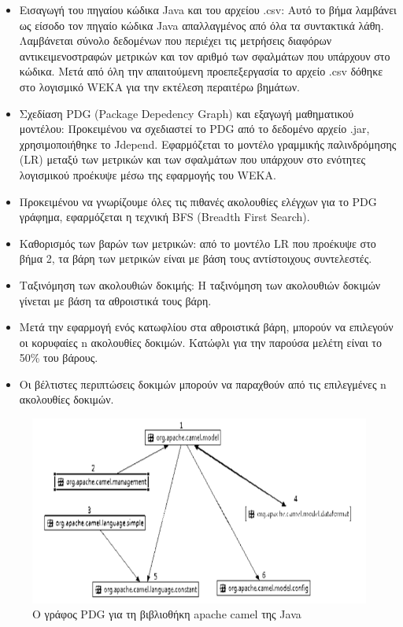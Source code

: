 \documentclass[12pt]{article}
\begin{document}
\begin{itemize}
\item Εισαγωγή του πηγαίου κώδικα Java και του αρχείου .csv: Αυτό το βήμα λαμβάνει ως είσοδο τον πηγαίο κώδικα Java απαλλαγμένος από όλα τα συντακτικά λάθη. Λαμβάνεται σύνολο δεδομένων που περιέχει τις μετρήσεις διαφόρων αντικειμενοστραφών μετρικών και τον αριθμό των σφαλμάτων που υπάρχουν στο κώδικα. Μετά από όλη την απαιτούμενη προεπεξεργασία το αρχείο .csv δόθηκε στο λογισμικό WEKA για την εκτέλεση περαιτέρω βημάτων.

\item Σχεδίαση PDG (Package Depedency Graph) και εξαγωγή μαθηματικού μοντέλου: Προκειμένου να σχεδιαστεί το PDG από το δεδομένο αρχείο .jar, χρησιμοποιήθηκε το Jdepend. Εφαρμόζεται το μοντέλο γραμμικής παλινδρόμησης (LR) μεταξύ των μετρικών και των σφαλμάτων που υπάρχουν στο ενότητες λογισμικού προέκυψε μέσω της εφαρμογής του WEKA.

\item Προκειμένου να γνωρίζουμε όλες τις πιθανές ακολουθίες ελέγχων για το PDG γράφημα, εφαρμόζεται η τεχνική BFS (Breadth First Search).

\item Καθορισμός των βαρών των μετρικών: από το μοντέλο LR που προέκυψε στο βήμα 2, τα βάρη των μετρικών είναι με βάση τους αντίστοιχους συντελεστές.

\item Ταξινόμηση των ακολουθιών δοκιμής: Η ταξινόμηση των ακολουθιών δοκιμών γίνεται με βάση τα αθροιστικά τους βάρη. 

\item Μετά την εφαρμογή ενός κατωφλίου στα αθροιστικά βάρη, μπορούν να επιλεγούν οι κορυφαίες n ακολουθίες δοκιμών. Κατώφλι για την παρούσα μελέτη είναι το 50\% του βάρους.

\item Οι βέλτιστες περιπτώσεις δοκιμών μπορούν να παραχθούν από τις επιλεγμένες n ακολουθίες δοκιμών.

\end{itemize}
 
\begin{figure}
\label{fig:pdg_graph}
\caption{Ο γράφος PDG για τη βιβλιοθήκη apache camel της Java}
\includegraphics[width=\textwidth,height=\textheight,keepaspectratio]{pdg_graph.PNG}
\end{figure}
\end{document}
